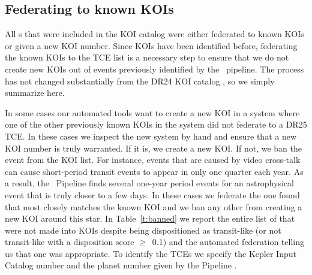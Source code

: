 \subsection{Federating to known KOIs}
\label{s:federation}
All \opstce s that were included in the KOI catalog were either federated to known KOIs or given a new KOI number. Since KOIs have been identified before, federating the known KOIs to the TCE list is a necessary step to ensure that we do not create new KOIs out of events previously identified by the \Kepler\ pipeline.  The process has not changed substantially from the DR24 KOI catalog \citep[see \S4.2 of][]{Coughlin2016}, so we simply summarize  here. 



In some cases our automated tools want to create a new KOI in a system where one of the other previously known KOIs in the system did not federate to a DR25 TCE.  In these cases we inspect the new system by hand and ensure that a new KOI number is truly warranted. If it is, we create a new KOI. If not, we ban the event from the KOI list.  For instance, events that are caused by video cross-talk \citep{KIH} can cause short-period transit events to appear in only one quarter each year. As a result, the \Kepler\ Pipeline finds several one-year period events for an astrophysical event that is truly closer to a few days.  In these cases we federate the one found that most closely matches the known KOI and we ban any other  from creating a new KOI around this star. In Table~\ref{t:banned} we report the entire list of  that were not made into KOIs despite being dispositioned as transit-like (or not transit-like with a disposition score $\ge$~0.1) and the automated federation telling us that one was appropriate. To identify the TCEs we specify the Kepler Input Catalog number and the planet number given by the \Kepler{} Pipeline \citep{Twicken2016}.



